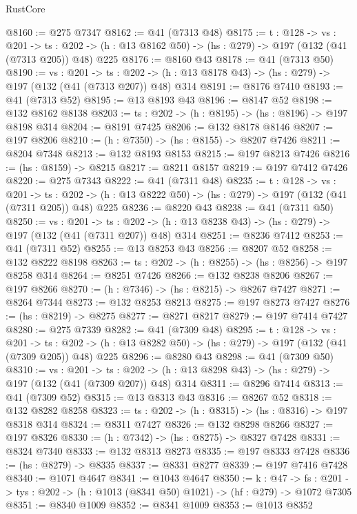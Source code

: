 \begin{lexlean}{RustCore}
\begin{coremodule}
@8160 := @275 @7347
@8162 := @41 (@7313 @48)
@8175 := {t : @128} ->
  {vs : @201} ->
  {ts : @202} -> (h : @13 @8162 @50) -> (hs : @279) -> @197 (@132 (@41 (@7313 @205)) @48) @225
@8176 := @8160 @43
@8178 := @41 (@7313 @50)
@8190 := {vs : @201} ->
  {ts : @202} -> (h : @13 @8178 @43) -> (hs : @279) -> @197 (@132 (@41 (@7313 @207)) @48) @314
@8191 := @8176 @7410
@8193 := @41 (@7313 @52)
@8195 := @13 @8193 @43
@8196 := @8147 @52
@8198 := @132 @8162 @8138
@8203 := {ts : @202} -> (h : @8195) -> (hs : @8196) -> @197 @8198 @314
@8204 := @8191 @7425
@8206 := @132 @8178 @8146
@8207 := @197 @8206
@8210 := (h : @7350) -> (hs : @8155) -> @8207 @7426
@8211 := @8204 @7348
@8213 := @132 @8193 @8153
@8215 := @197 @8213 @7426
@8216 := (hs : @8159) -> @8215
@8217 := @8211 @8157
@8219 := @197 @7412 @7426
@8220 := @275 @7343
@8222 := @41 (@7311 @48)
@8235 := {t : @128} ->
  {vs : @201} ->
  {ts : @202} -> (h : @13 @8222 @50) -> (hs : @279) -> @197 (@132 (@41 (@7311 @205)) @48) @225
@8236 := @8220 @43
@8238 := @41 (@7311 @50)
@8250 := {vs : @201} ->
  {ts : @202} -> (h : @13 @8238 @43) -> (hs : @279) -> @197 (@132 (@41 (@7311 @207)) @48) @314
@8251 := @8236 @7412
@8253 := @41 (@7311 @52)
@8255 := @13 @8253 @43
@8256 := @8207 @52
@8258 := @132 @8222 @8198
@8263 := {ts : @202} -> (h : @8255) -> (hs : @8256) -> @197 @8258 @314
@8264 := @8251 @7426
@8266 := @132 @8238 @8206
@8267 := @197 @8266
@8270 := (h : @7346) -> (hs : @8215) -> @8267 @7427
@8271 := @8264 @7344
@8273 := @132 @8253 @8213
@8275 := @197 @8273 @7427
@8276 := (hs : @8219) -> @8275
@8277 := @8271 @8217
@8279 := @197 @7414 @7427
@8280 := @275 @7339
@8282 := @41 (@7309 @48)
@8295 := {t : @128} ->
  {vs : @201} ->
  {ts : @202} -> (h : @13 @8282 @50) -> (hs : @279) -> @197 (@132 (@41 (@7309 @205)) @48) @225
@8296 := @8280 @43
@8298 := @41 (@7309 @50)
@8310 := {vs : @201} ->
  {ts : @202} -> (h : @13 @8298 @43) -> (hs : @279) -> @197 (@132 (@41 (@7309 @207)) @48) @314
@8311 := @8296 @7414
@8313 := @41 (@7309 @52)
@8315 := @13 @8313 @43
@8316 := @8267 @52
@8318 := @132 @8282 @8258
@8323 := {ts : @202} -> (h : @8315) -> (hs : @8316) -> @197 @8318 @314
@8324 := @8311 @7427
@8326 := @132 @8298 @8266
@8327 := @197 @8326
@8330 := (h : @7342) -> (hs : @8275) -> @8327 @7428
@8331 := @8324 @7340
@8333 := @132 @8313 @8273
@8335 := @197 @8333 @7428
@8336 := (hs : @8279) -> @8335
@8337 := @8331 @8277
@8339 := @197 @7416 @7428
@8340 := @1071 @4647
@8341 := @1043 @4647
@8350 := {k : @47} ->
  {fs : @201} -> {tys : @202} -> (h : @1013 (@8341 @50) @1021) -> (hf : @279) -> @1072 @7305
@8351 := @8340 @1009
@8352 := @8341 @1009
@8353 := @1013 @8352

\end{coremodule}
\end{lexlean}
